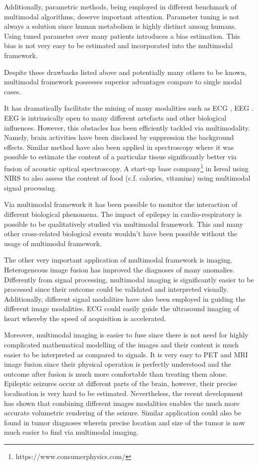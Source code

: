 \documentclass[a4paper]{article}
\begin{document}
Additionally, parametric methods, being employed in different benchmark of multimodal algorithms, deserve important attention. Parameter tuning is not always a solution since human metabolism is highly distinct among humans. Using tuned parameter over many patients introduces a bias estimation. This bias is not very easy to be estimated and incorporated into the multimodal framework. 

Despite these drawbacks listed above and potentially many others to be known, multimodal framework possesses superior advantages compare to single modal cases. 

It has dramatically facilitate the mining of many modalities  such as ECG , EEG \cite{5}. EEG is intrinsically open to many different artefacts and other biological influences. However, this obstacles has been efficiently tackled via multimodality. Namely, brain activities have been disclosed by suppression the background effects. Similar method have also been applied in spectroscopy where it was possible to estimate the content of a particular tissue significantly better via fusion of acoustic optical spectroscopy. A start-up base company\footnote{https://www.consumerphysics.com/} in Isreal using NIRS to also assess the content of food (c.f. calories, vitamins) using multimodal signal processing. 


Via multimodal framework it has been possible to monitor the interaction of different biological phenomena. The impact of epilepsy in cardio-respiratory is possible to be qualitatively studied via multimodal framework. This and many other cross-related biological events wouldn't have been possible without the usage of multimodal framework. 


The other very important application of multimodal framework is imaging. Heterogeneous image fusion has improved the diagnoses of many anomalies. Differently from signal processing, multimodal imaging is significantly easier to be processed since their outcome could be validated and interpreted visually. Additionally, different signal modalities have also been employed in guiding the different image modalities. ECG could easily guide the ultrasound imaging of heart whereby the speed of acquisition is accelerated. 

Moreover, multimodal imaging is easier to fuse since there is not need for highly complicated mathematical modelling of the images and their content is much easier to be interpreted as compared to signals. It is very easy to PET and MRI image fusion since their physical operation is perfectly understood and the outcome after fusion is much more comfortable than treating them alone. Epileptic seizures occur at different parts of the brain, however, their precise localisation is very hard to be estimated. Nevertheless, the recent development has shown that combining different images modalities enables the much more accurate volumetric rendering of the seizure. Similar application could also be found in tumor diagnoses wherein precise location and size of the tumor is now much easier to find via multimodal imaging.
\end{document}
